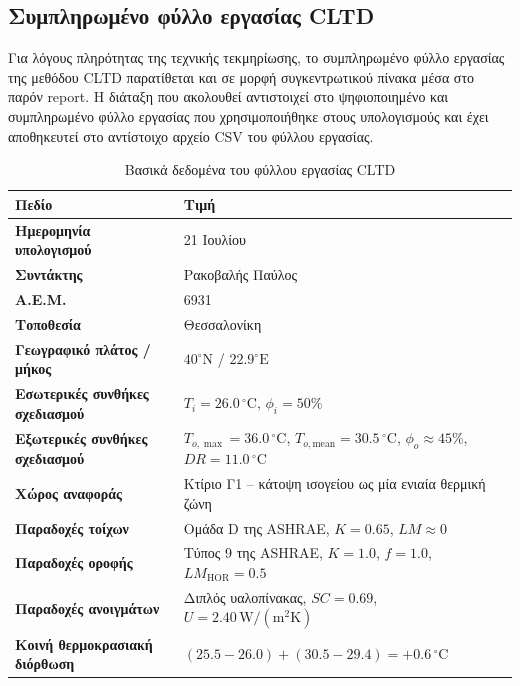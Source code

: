\documentclass[12pt,a4paper]{article}
\begin{document}
\subsection{Συμπληρωμένο φύλλο εργασίας CLTD}

Για λόγους πληρότητας της τεχνικής τεκμηρίωσης, το συμπληρωμένο φύλλο εργασίας της
μεθόδου CLTD παρατίθεται και σε μορφή συγκεντρωτικού πίνακα μέσα στο παρόν report.
Η διάταξη που ακολουθεί αντιστοιχεί στο ψηφιοποιημένο και συμπληρωμένο φύλλο
εργασίας που χρησιμοποιήθηκε στους υπολογισμούς και έχει αποθηκευτεί στο αντίστοιχο
αρχείο CSV του φύλλου εργασίας.

\begin{table}[H]
\centering
\caption{Βασικά δεδομένα του φύλλου εργασίας CLTD}
\begin{tabular}{>{\bfseries}p{4.8cm}p{10.2cm}}
\toprule
Πεδίο & Τιμή \\
\midrule
Ημερομηνία υπολογισμού & 21 Ιουλίου \\
Συντάκτης & Ρακοβαλής Παύλος \\
Α.Ε.Μ. & 6931 \\
Τοποθεσία & Θεσσαλονίκη \\
Γεωγραφικό πλάτος / μήκος & \(40^\circ\mathrm{N}\) / \(22.9^\circ\mathrm{E}\) \\
Εσωτερικές συνθήκες σχεδιασμού & \(T_i = 26.0\,^\circ\mathrm{C}\), \(\phi_i = 50\%\) \\
Εξωτερικές συνθήκες σχεδιασμού & \(T_{o,\max}=36.0\,^\circ\mathrm{C}\), \(T_{o,\mathrm{mean}}=30.5\,^\circ\mathrm{C}\), \(\phi_o \approx 45\%\), \(DR=11.0\,^\circ\mathrm{C}\) \\
Χώρος αναφοράς & Κτίριο Γ1 -- κάτοψη ισογείου ως μία ενιαία θερμική ζώνη \\
Παραδοχές τοίχων & Ομάδα D της ASHRAE, \(K=0.65\), \(LM \approx 0\) \\
Παραδοχές οροφής & Τύπος 9 της ASHRAE, \(K=1.0\), \(f=1.0\), \(LM_{\mathrm{HOR}}=0.5\) \\
Παραδοχές ανοιγμάτων & Διπλός υαλοπίνακας, \(SC = 0.69\), \(U = 2.40\,\mathrm{W/(m^2K)}\) \\
Κοινή θερμοκρασιακή διόρθωση & \((25.5 - 26.0) + (30.5 - 29.4) = +0.6\,^\circ\mathrm{C}\) \\
\bottomrule
\end{tabular}
\end{table}
\end{document}
